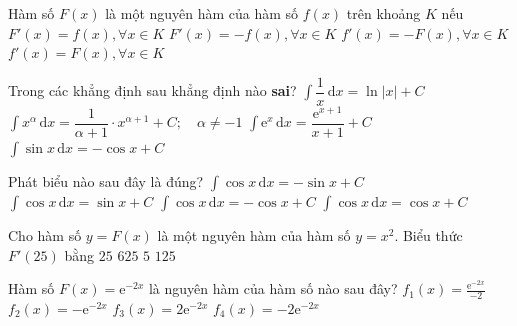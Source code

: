\begin{ex}%
	Hàm số $F(x)$ là một nguyên hàm của hàm số $f(x)$ trên khoảng $K$ nếu 
	 \choice
		{\True  $F'(x)=f(x), \forall x \in K$}
		{$F'(x)=-f(x), \forall  x \in K$}
		{$f'(x)=-F(x), \forall  x \in K$}
		{$f'(x)=F(x), \forall x \in  K$}
\end{ex}

\begin{ex}%
	Trong các khẳng định sau khẳng định nào  \textbf{sai}?
	 \choice
		 {$\displaystyle\int\dfrac{1}{x}\mathrm{\,d}{x}=\ln|x|+C$}
		{$\displaystyle\int{x^\alpha}\mathrm{\,d}{x}=\dfrac{1}{\alpha+1} \cdot x^{\alpha+1}+C;  \quad \alpha \neq -1$}
		 {\True $\displaystyle\int\mathrm{e}^x\mathrm{\,d}{x}=\dfrac{\mathrm{e}^{x+1}}{x+1}+C$}
		 {$\displaystyle\int\sin{x}\mathrm{\,d}{x}=-\cos{x}+C$}
\end{ex}

\begin{ex}%
	 Phát biểu nào sau đây là đúng?
	 \choice
		{$\displaystyle\int \cos{x}\mathrm{\,d}x = -\sin{x}+  C$}
		{\True $\displaystyle\int  \cos{x}\mathrm{\,d}x = \sin{x}+ C$}
		{$\displaystyle\int \cos{x}\mathrm{\,d}x =  -\cos{x}+ C$}
		 {$\displaystyle\int \cos{x}\mathrm{\,d}x = \cos{x}+ C$}
\end{ex}

\begin{ex}%
	 Cho hàm số $ y=F(x)$ là một nguyên hàm của hàm số $ y=x^2$. Biểu thức $ F'(25)$ bằng
	 \choice
		{$ 25$} 
		 {\True $ 625$}
		 {$ 5$}
		 {$ 125$}
\end{ex}

\begin{ex}%
	Hàm số $F(x)=\mathrm{e}^{-2x}$ là nguyên hàm của hàm  số nào sau đây?
	 \choice
		{$f_1(x)=\frac{\mathrm{e}^{-2x}}{-2}$} 
		{$f_2(x)=-\mathrm{e}^{-2x}$} 
		 {$f_3(x)=2\mathrm{e}^{-2x}$}
		{\True  $f_4(x)=-2\mathrm{e}^{-2x}$}
\end{ex}

